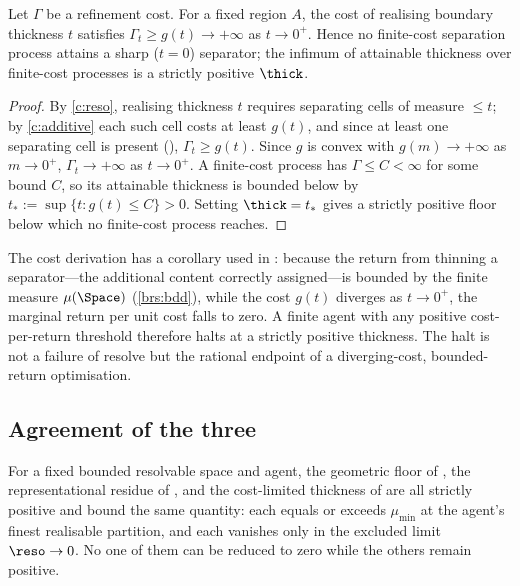 \begin{theorem}
\label{thm:cost}
Let $\Gamma$ be a refinement cost. For a fixed region $A$, the cost of realising
boundary thickness $t$ satisfies $\Gamma_t\ge g(t)\to+\infty$ as $t\to0^+$.
Hence no finite-cost separation process attains a sharp ($t=0$) separator; the
infimum of attainable thickness over finite-cost processes is a strictly
positive $\thick$.
\end{theorem}

\begin{proof}
By \ref{c:reso}, realising thickness $t$ requires separating cells of measure
$\le t$; by \ref{c:additive} each such cell costs at least $g(t)$, and since at
least one separating cell is present (),
$\Gamma_t\ge g(t)$. Since $g$ is convex with $g(m)\to+\infty$ as $m\to0^+$,
$\Gamma_t\to+\infty$ as $t\to0^+$. A finite-cost process has $\Gamma\le C<\infty$
for some bound $C$, so its attainable thickness is bounded below by
$t_\ast:=\sup\{t:g(t)\le C\}>0$. Setting $\thick=t_\ast$ gives a strictly
positive floor below which no finite-cost process reaches.
\end{proof}

\begin{remark}
\label{rem:bounded-return}
The cost derivation has a corollary used in : because the
return from thinning a separator---the additional content correctly assigned---is
bounded by the finite measure $\mu(\Space)$ (\ref{brs:bdd}), while the cost
$g(t)$ diverges as $t\to0^+$, the marginal return per unit cost falls to zero.
A finite agent with any positive cost-per-return threshold therefore halts at a
strictly positive thickness. The halt is not a failure of resolve but the
rational endpoint of a diverging-cost, bounded-return optimisation.
\end{remark}

\subsection{Agreement of the three}

\begin{theorem}
\label{thm:floor-agree}
For a fixed bounded resolvable space and agent, the geometric floor of
, the representational residue of , and
the cost-limited thickness of  are all strictly positive and
bound the same quantity: each equals or exceeds $\mu_{\min}$ at the agent's
finest realisable partition, and each vanishes only in the excluded limit
$\reso\to0$. No one of them can be reduced to zero while the others remain
positive.
\end{theorem}

